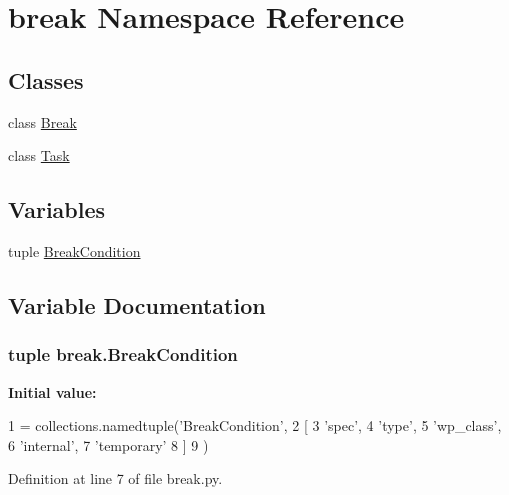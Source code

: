 \hypertarget{namespacebreak}{}\section{break Namespace Reference}
\label{namespacebreak}
\subsection*{Classes}
\begin{DoxyCompactItemize}
\item 
class \hyperlink{classbreak_1_1Break}{Break}
\item 
class \hyperlink{classbreak_1_1Task}{Task}
\end{DoxyCompactItemize}
\subsection*{Variables}
\begin{DoxyCompactItemize}
\item 
tuple \hyperlink{namespacebreak_afb331f1d806548cb3369026f790e2fdd}{Break\+Condition}
\end{DoxyCompactItemize}


\subsection{Variable Documentation}
\hypertarget{namespacebreak_afb331f1d806548cb3369026f790e2fdd}{}
\subsubsection[{Break\+Condition}]{\setlength{\rightskip}{0pt plus 5cm}tuple break.\+Break\+Condition}\label{namespacebreak_afb331f1d806548cb3369026f790e2fdd}
{\bfseries Initial value\+:}
\begin{DoxyCode}
1 = collections.namedtuple(\textcolor{stringliteral}{'BreakCondition'},
2                                         [
3                                          \textcolor{stringliteral}{'spec'},
4                                          \textcolor{stringliteral}{'type'},
5                                          \textcolor{stringliteral}{'wp\_class'},
6                                          \textcolor{stringliteral}{'internal'},
7                                          \textcolor{stringliteral}{'temporary'}
8                                         ]
9                                        )
\end{DoxyCode}


Definition at line 7 of file break.\+py.


